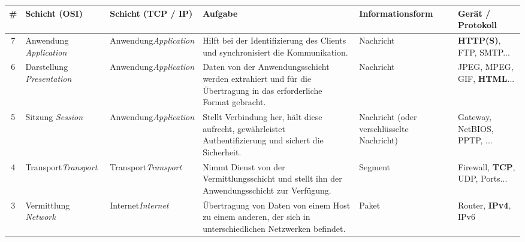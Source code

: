 \begin{table}[H]
	\centering
	\footnotesize
	\begin{tabular}{c|m{2.6cm}||m{2cm}||m{4.6cm}|m{2.5cm}|m{2cm}}
		\textbf{\#}              & \textbf{Schicht (OSI)}                     & \textbf{Schicht \newline (TCP / IP)}  & \textbf{Aufgabe}                                                                                                & \textbf{Informations\-form}       & \textbf{Gerät / \newline Protokoll}   \\ \midrule\midrule
		\rowcolor{yellow!10}7    & Anwendung \newline \textit{Application}    & Anwendung\newline\textit{Application} & Hilft bei der Identifizierung des Clients und synchronisiert die Kommunikation.                                 & Nachricht                                 & \textbf{HTTP(S)}, FTP, SMTP...        \\\midrule
		\rowcolor{yellow!20}6    & Darstellung \newline \textit{Presentation} & Anwendung\newline\textit{Application} & Daten von der Anwendungsschicht werden extrahiert und für die Übertragung in das erforderliche Format gebracht. & Nachricht                                 & JPEG, MPEG, GIF, \textbf{HTML}...     \\\midrule
		\rowcolor{yellow!30}5    & Sitzung \newline \textit{Session}          & Anwendung\newline\textit{Application} & Stellt Verbindung her, hält diese aufrecht, gewährleistet Authentifizierung und sichert die Sicherheit.         & Nachricht (oder verschlüsselte Nachricht) & Gateway, NetBIOS, PPTP, ...           \\\midrule
		\rowcolor{orange!20}4    & Transport\newline \textit{Transport}       & Transport\newline\textit{Transport}   & Nimmt Dienst von der Vermittlungsschicht und stellt ihn der Anwendungsschicht zur Verfügung.                    & Segment                                   & Firewall, \textbf{TCP}, UDP, Ports... \\\midrule
		\rowcolor{RoyalBlue!20}3 & Vermittlung \newline \textit{Network}      & Internet\newline\textit{Internet}     & Übertragung von Daten von einem Host zu einem anderen, der sich in unterschiedlichen Netzwerken befindet.       & Paket                                     & Router, \textbf{IPv4}, IPv6           \\\midrule

\end{tabular}
\end{table}
